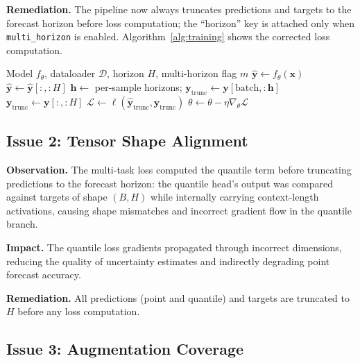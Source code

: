 \documentclass[11pt]{article}
\begin{document}
\textbf{Remediation.} The pipeline now always truncates predictions and targets to the forecast horizon before loss computation; the ``horizon'' key is attached only when \texttt{multi\_horizon} is enabled. Algorithm~\ref{alg:training} shows the corrected loss computation.

\begin{algorithm}[t]
\caption{Training loop with corrected loss computation.}
\label{alg:training}
\begin{algorithmic}[1]
\Require Model $f_\theta$, dataloader $\mathcal{D}$, horizon $H$, multi-horizon flag $m$
    \State $\hat{\mathbf{y}} \gets f_\theta(\mathbf{x})$
    \State $\hat{\mathbf{y}} \gets \hat{\mathbf{y}}[:, :H]$ 
        \State $\mathbf{h} \gets$ per-sample horizons; \quad $\mathbf{y}_{\text{trunc}} \gets \mathbf{y}[\text{batch}, :\mathbf{h}]$
    \Else
        \State $\mathbf{y}_{\text{trunc}} \gets \mathbf{y}[:, :H]$
    \EndIf
    \State $\mathcal{L} \gets \ell(\hat{\mathbf{y}}_{\text{trunc}}, \mathbf{y}_{\text{trunc}})$
    \State $\theta \gets \theta - \eta \nabla_\theta \mathcal{L}$
\EndFor
\end{algorithmic}
\end{algorithm}

\subsection{Issue 2: Tensor Shape Alignment}
\label{sec:issue2}

\textbf{Observation.} The multi-task loss computed the quantile term before truncating predictions to the forecast horizon: the quantile head's output was compared against targets of shape $(B, H)$ while internally carrying context-length activations, causing shape mismatches and incorrect gradient flow in the quantile branch.

\textbf{Impact.} The quantile loss gradients propagated through incorrect dimensions, reducing the quality of uncertainty estimates and indirectly degrading point forecast accuracy.

\textbf{Remediation.} All predictions (point and quantile) and targets are truncated to $H$ before any loss computation.

\subsection{Issue 3: Augmentation Coverage}
\label{sec:issue3}
\end{document}
